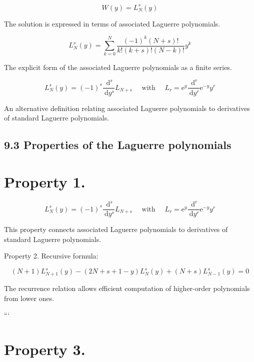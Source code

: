 \documentclass[italian]{HKNdocument}
\begin{document}
\begin{equation*}
W(y)=L_{N}^{s}(y) \tag{9.72}
\end{equation*}

The solution is expressed in terms of associated Laguerre polynomials.

\begin{equation*}
L_{N}^{s}(y)=\sum_{k=0}^{N} \frac{(-1)^{k}(N+s)!}{k!(k+s)!(N-k)!} y^{k} \tag{9.73}
\end{equation*}

The explicit form of the associated Laguerre polynomials as a finite series.

\begin{equation*}
L_{N}^{s}(y)=(-1)^{s} \frac{\mathrm{~d}^{s}}{\mathrm{~d} y^{s}} L_{N+s} \quad \text { with } \quad L_{r}=\mathrm{e}^{y} \frac{\mathrm{~d}^{r}}{\mathrm{~d} y^{r}} \mathrm{e}^{-y} y^{r} \tag{9.74}
\end{equation*}

An alternative definition relating associated Laguerre polynomials to derivatives of standard Laguerre polynomials.

\subsection*{9.3 Properties of the Laguerre polynomials}
\section*{Property 1.}

\begin{equation*}
L_{N}^{s}(y)=(-1)^{s} \frac{\mathrm{~d}^{s}}{\mathrm{~d} y^{s}} L_{N+s} \quad \text { with } \quad L_{r}=\mathrm{e}^{y} \frac{\mathrm{~d}^{r}}{\mathrm{~d} y^{r}} \mathrm{e}^{-y} y^{r} \tag{9.75}
\end{equation*}

This property connects associated Laguerre polynomials to derivatives of standard Laguerre polynomials.

Property 2. Recursive formula:

\begin{equation*}
(N+1) L_{N+1}^{s}(y)-(2 N+s+1-y) L_{N}^{s}(y)+(N+s) L_{N-1}^{s}(y)=0 \tag{9.76}
\end{equation*}

The recurrence relation allows efficient computation of higher-order polynomials from lower ones.

```
\section*{Property 3.}
\end{document}

